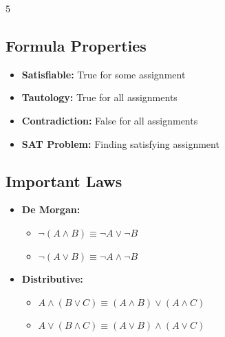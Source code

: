 \documentclass[a4paper,landscape]{article}
\begin{document}
\begin{multicols*}{5}
\subsection*{Formula Properties}
\begin{itemize}[leftmargin=*, itemsep=0pt]
    \item \textbf{Satisfiable:} True for some assignment
    \item \textbf{Tautology:} True for all assignments
    \item \textbf{Contradiction:} False for all assignments
    \item \textbf{SAT Problem:} Finding satisfying assignment
\end{itemize}

\subsection*{Important Laws}
\begin{itemize}[leftmargin=*, itemsep=0pt]
    \item \textbf{De Morgan:} 
    \begin{itemize}[leftmargin=*, itemsep=0pt]
        \item $\neg(A\wedge B) \equiv \neg A\vee\neg B$
        \item $\neg(A\vee B) \equiv \neg A\wedge\neg B$
    \end{itemize}
    \item \textbf{Distributive:}
    \begin{itemize}[leftmargin=*, itemsep=0pt]
        \item $A\wedge(B\vee C) \equiv (A\wedge B)\vee(A\wedge C)$
        \item $A\vee(B\wedge C) \equiv (A\vee B)\wedge(A\vee C)$
    \end{itemize}
\end{itemize}


\end{multicols*}
\end{document}

